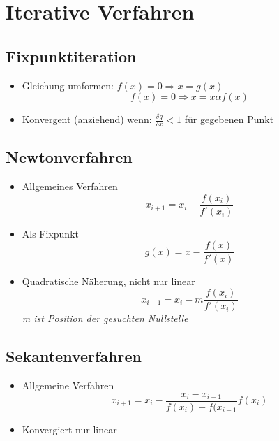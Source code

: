 \section{Iterative Verfahren}

\subsection{Fixpunktiteration}
\begin{itemize}

	\item Gleichung umformen: $f(x) = 0 \Rightarrow x = g(x)$\\
	\begin{equation*}
		f(x) = 0 \Rightarrow x = x \alpha f(x)
	\end{equation*}
	
	\item Konvergent (anziehend) wenn: $\frac{\delta g}{\delta x} < 1$ für gegebenen Punkt\\

\end{itemize}

\subsection{Newtonverfahren}
\begin{itemize}

	\item Allgemeines Verfahren
	\begin{equation*}
		x_{i+1} = x_i - \frac{f(x_i)}{f'(x_i)}
	\end{equation*}
	
	\item Als Fixpunkt
	\begin{equation*}
		g(x) = x - \frac{f(x)}{f'(x)}
	\end{equation*}
	
	\item Quadratische Näherung, nicht nur linear
	\begin{equation*}
		x_{i+1} = x_i - m \frac{f(x_i)}{f'(x_i)}
	\end{equation*}
	\textit{m ist Position der gesuchten Nullstelle}

\end{itemize}

\subsection{Sekantenverfahren}
\begin{itemize}

	\item Allgemeine Verfahren
	\begin{equation*}
		x_{i+1} = x_i - \frac{x_i - x_{i-1}}{f(x_i) - f(x_{i-1}} f(x_i)
	\end{equation*}
	
	\item Konvergiert nur linear

\end{itemize}

